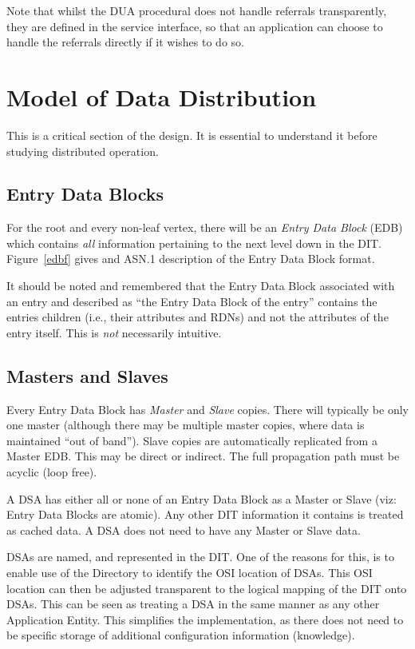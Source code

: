 Note that whilst the DUA procedural does not handle referrals transparently,
they are defined in the service interface, so that an application can
choose to handle the referrals directly if it wishes to do so.

\section {Model of Data Distribution}
\label {model-dist}

This is a critical section of the design.   It is essential to understand it
before studying distributed operation.

\subsection {Entry Data Blocks}

For the root and every non-leaf vertex, there will be an
{\em Entry Data Block} (EDB)
which contains
{\em all}
information pertaining
to the next level down in the DIT.
Figure~\ref{edbf} gives and ASN.1 description of
the Entry Data Block format.



It should be noted and remembered that 
the Entry Data Block associated with an entry and described as ``the Entry
Data Block of the entry'' contains the entries children (i.e., their
attributes and RDNs)
and not the attributes of the entry itself.
This is {\em not} necessarily intuitive.



\subsection {Masters and Slaves}

Every Entry Data Block has {\em Master}  and {\em Slave} copies.
There will typically be only one master (although there may be
multiple master copies, where data is maintained ``out of band'').
Slave copies are automatically replicated from a Master EDB.
This may be direct or indirect.  The full propagation path must be acyclic
(loop free).

A DSA has either all or none of an Entry Data Block 
as a Master or Slave
(viz: Entry Data Blocks are atomic).
Any other DIT information it contains is treated as cached
data.
A DSA does not need to have any Master or Slave data.


DSAs are named, and represented in the DIT.
One of the reasons for this, is to enable use of the
Directory to identify the OSI location of DSAs.
This OSI location can then be adjusted transparent to the
logical mapping of the DIT onto DSAs.
This can be seen as treating a DSA in the same manner as any other
Application Entity.
This simplifies the implementation, as there does not need  to be
specific storage of additional configuration information (knowledge).

